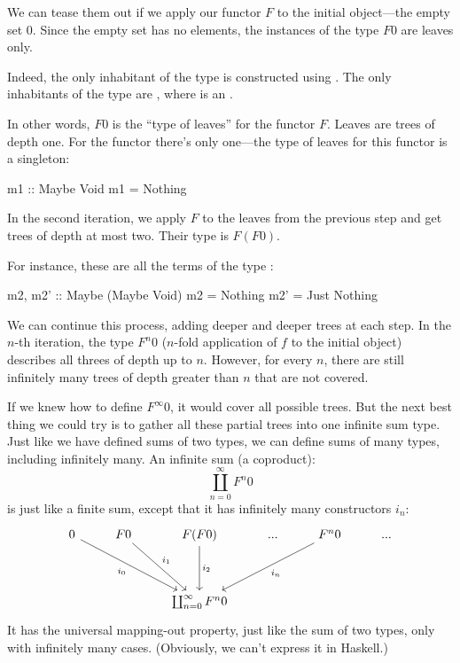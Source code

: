 \documentclass[DaoFP]{subfiles}
\begin{document}
We can tease them out if we apply our functor $F$ to the initial object---the empty set $0$. Since the empty set has no elements, the instances of the type $F 0$ are leaves only. 

Indeed, the only inhabitant of the type  is constructed using . The only inhabitants of the type  are , where  is an .

In other words, $F 0$ is the ``type of leaves'' for the functor $F$. Leaves are trees of depth one. For the  functor there's only one---the type of leaves for this functor is a singleton:
\begin{haskell}
m1 :: Maybe Void
m1 = Nothing
\end{haskell}

In the second iteration, we apply $F$ to the leaves from the previous step and get trees of depth at most two. Their type is $F(F 0)$. 

For instance, these are all the terms of the type :
\begin{haskell}
m2, m2' :: Maybe (Maybe Void)
m2 = Nothing
m2' = Just Nothing
\end{haskell}

We can continue this process, adding deeper and deeper trees at each step. In the $n$-th iteration, the type $F^n 0$ ($n$-fold application of $f$ to the initial object) describes all threes of depth up to $n$. However, for every $n$, there are still infinitely many trees of depth greater than $n$ that are not covered. 

If we knew how to define $F^{\infty} 0$, it would cover all possible trees. But the next best thing we could try is to gather all these partial trees into one infinite sum type. Just like we have defined sums of two types, we can define sums of many types, including infinitely many. An infinite sum (a coproduct):
$$ \coprod_{n = 0}^{\infty} F^n 0$$
is just like a finite sum, except that it has infinitely many constructors $i_n$:
\[
 \begin{tikzcd}
 0
 \arrow[ddrr, "i_0"']
 & F 0
  \arrow[ddr, "i_1"]
& F (F 0)
  \arrow[dd, "i_2"]
 & ...
 & F^n 0
  \arrow[ddll, "i_n"]
 & ...
 \\
 \\
 &&\coprod_{n = 0}^{\infty} F^n 0
  \end{tikzcd}
\]
It has the universal mapping-out property, just like the sum of two types, only with infinitely many cases. (Obviously, we can't express it in Haskell.)
\end{document}
